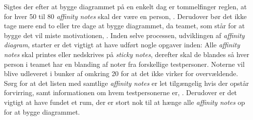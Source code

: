 Sigtes der efter at bygge diagrammet på en enkelt dag er tommelfinger reglen, at for hver 50 til 80 \textit{affinity notes} skal der være en person, \parencite[s. 163]{Book:BuildingAnAffinity}. Derudover bør det ikke tage mere end to eller tre dage at bygge diagrammet, da teamet, som står for at bygge det vil miste motivationen, \parencite[s. 163]{Book:BuildingAnAffinity}.\blankline
%
Inden selve processen, udviklingen af \textit{affinity diagram}, starter er det vigtigt at have udført nogle opgaver inden: Alle \textit{affinity notes} skal printes eller nedskrives på \textit{sticky notes}, derefter skal de blandes så hver person i teamet har en blanding af noter fra forskellige testpersoner. Noterne vil blive udleveret i bunker af omkring 20 for at det ikke virker for overvældende. Sørg for at det listen med samtlige \textit{affinity notes} er let tilgængelig hvis der opstår forvirring, samt informationen om hvem testpersonerne er, \parencite[ss. 163-164]{Book:BuildingAnAffinity}. Derudover er det vigtigt at have fundet et rum, der er stort nok til at hænge alle \textit{affinity notes} op for at bygge diagrammet. 

